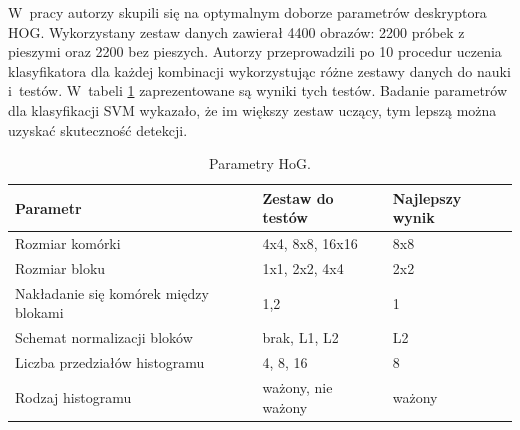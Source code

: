 W~pracy autorzy skupili się na optymalnym doborze parametrów deskryptora HOG. 
Wykorzystany zestaw danych zawierał 4400 obrazów: 2200 próbek z pieszymi oraz 2200 bez pieszych. 
Autorzy przeprowadzili po 10 procedur uczenia klasyfikatora dla każdej kombinacji wykorzystując różne zestawy danych do nauki i~testów. 
W~tabeli \ref{tab:parametryhog} zaprezentowane są wyniki tych testów. 
Badanie parametrów dla klasyfikacji SVM wykazało, że im większy zestaw uczący, tym lepszą można uzyskać skuteczność detekcji.

\begin{table}[!h]
\centering
\begin{threeparttable}
\caption{Parametry HoG.}
\label{tab:parametryhog}
\begin{tabularx}{1\textwidth}{|l|X|X|}

\hline Parametr & Zestaw do testów & Najlepszy wynik \\
\hline Rozmiar komórki & 4x4, 8x8, 16x16 & 8x8 \\
\hline Rozmiar bloku & 1x1, 2x2, 4x4 & 2x2 \\
\hline Nakładanie się komórek między blokami & 1,2 & 1 \\
\hline Schemat normalizacji bloków & brak, L1, L2 & L2 \\
\hline Liczba przedziałów histogramu & 4, 8, 16 & 8 \\
\hline Rodzaj histogramu & ważony, nie ważony & ważony \\
\hline

\end{tabularx}
\end{threeparttable}
\end{table}





